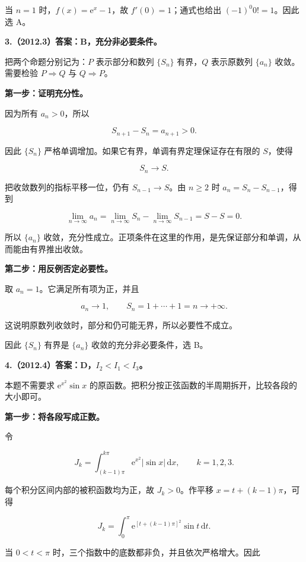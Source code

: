 \documentclass[UTF8,11pt,fontset=windows]{ctexart}
\begin{document}
当 $n=1$ 时，$f(x)=\mathrm e^x-1$，故 $f'(0)=1$；通式也给出 $(-1)^0 0!=1$。因此选 A。

\clearpage

\textbf{3.（2012.3）答案：B，充分非必要条件。}

把两个命题分别记为：$P$ 表示部分和数列 $\{S_n\}$ 有界，$Q$ 表示原数列 $\{a_n\}$ 收敛。需要检验 $P\Rightarrow Q$ 与 $Q\Rightarrow P$。

\textbf{第一步：证明充分性。}

因为所有 $a_n>0$，所以

$$
S_{n+1}-S_n=a_{n+1}>0.
$$

因此 $\{S_n\}$ 严格单调增加。如果它有界，单调有界定理保证存在有限的 $S$，使得

$$
S_n\longrightarrow S.
$$

把收敛数列的指标平移一位，仍有 $S_{n-1}\to S$。由 $n\ge2$ 时 $a_n=S_n-S_{n-1}$，得到

$$
\lim_{n\to\infty}a_n
=\lim_{n\to\infty}S_n-\lim_{n\to\infty}S_{n-1}
=S-S=0.
$$

所以 $\{a_n\}$ 收敛，充分性成立。正项条件在这里的作用，是先保证部分和单调，从而能由有界推出收敛。

\textbf{第二步：用反例否定必要性。}

取 $a_n=1$。它满足所有项为正，并且

$$
a_n\longrightarrow1,
\qquad S_n=1+\cdots+1=n\longrightarrow+\infty.
$$

这说明原数列收敛时，部分和仍可能无界，所以必要性不成立。

因此 $\{S_n\}$ 有界是 $\{a_n\}$ 收敛的充分非必要条件，选 B。

\clearpage

\textbf{4.（2012.4）答案：D，$I_2<I_1<I_3$。}

本题不需要求 $\mathrm e^{x^2}\sin x$ 的原函数。把积分按正弦函数的半周期拆开，比较各段的大小即可。

\textbf{第一步：将各段写成正数。}

令

$$
J_k=\int_{(k-1)\pi}^{k\pi}\mathrm e^{x^2}|\sin x|\,\mathrm dx,
\qquad k=1,2,3.
$$

每个积分区间内部的被积函数均为正，故 $J_k>0$。作平移 $x=t+(k-1)\pi$，可得

$$
J_k=\int_0^\pi\mathrm e^{[t+(k-1)\pi]^2}\sin t\,\mathrm dt.
$$

当 $0<t<\pi$ 时，三个指数中的底数都非负，并且依次严格增大。因此
\end{document}
